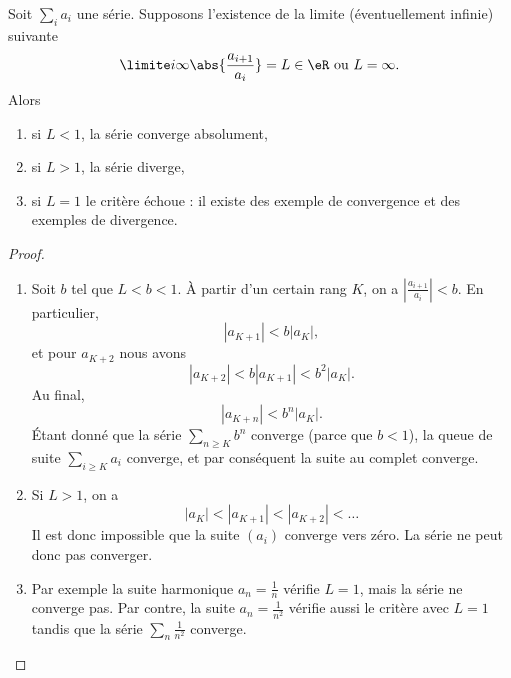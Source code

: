 \begin{proposition}     \label{PropOXKUooQmAaJX}
    Soit $\sum_i a_i$ une série. Supposons l'existence de la limite (éventuellement infinie) suivante
    \begin{equation}
      \limite i \infty \abs{\frac{a_{i+1}}{a_i}} = L\in \eR \text{ ou $L =
        \infty$.}
    \end{equation}
    Alors
    \begin{enumerate}
    \item si $L < 1$, la série converge absolument,
    \item si $L > 1$, la série diverge,
    \item si $L = 1$ le critère échoue : il existe des exemple de convergence et des exemples de divergence.
    \end{enumerate}
\end{proposition}

\begin{proof}
\begin{enumerate}
    \item
        Soit $b$ tel que $L<b<1$. À partir d'un certain rang $K$, on a $\left| \frac{ a_{i+1} }{ a_i } \right| <b$. En particulier,
        \begin{equation}
            | a_{K+1} |<b| a_K |,
        \end{equation}
        et pour $a_{K+2}$ nous avons
        \begin{equation}
            | a_{K+2} |<b| a_{K+1} |<b^2| a_K |.
        \end{equation}
        Au final,
        \begin{equation}
            | a_{K+n} |<b^n| a_K |.
        \end{equation}
        Étant donné que la série $\sum_{n\geq K}b^n$ converge (parce que $b<1$), la queue de suite $\sum_{i\geq K}a_i$ converge, et par conséquent la suite au complet converge.
    \item
        Si $L>1$, on a
        \begin{equation}
            | a_K |<| a_{K+1} |<| a_{K+2} |<\ldots
        \end{equation}
        Il est donc impossible que la suite $(a_i)$ converge vers zéro. La série ne peut donc pas converger.
    \item
        Par exemple la suite harmonique $a_n=\frac{1}{ n }$ vérifie $L=1$, mais la série ne converge pas. Par contre, la suite $a_n=\frac{ 1 }{ n^2 }$ vérifie aussi le critère avec $L=1$ tandis que la série $\sum_n\frac{1}{ n^2 }$ converge.
\end{enumerate}
\end{proof}


